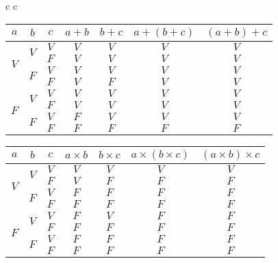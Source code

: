 \documentclass{scrartcl}
\begin{document}
			\begin{adjustbox}{center}
			\begin{tabular}{c c}
			\begin{tabular}{|c|c|c|c|c|c|c|}
				\hline
				$a$                  & $b$                  & $c$ & $a+b$ & $b+c$ & $a+(b+c)$ & $(a+b)+c$ \\ \hline
				\multirow{4}{*}{$V$} & \multirow{2}{*}{$V$} & $V$ & $V$   & $V$   & $V$       & $V$       \\ \cline{3-7} 
									 &                      & $F$ & $V$   & $V$   & $V$       & $V$       \\ \cline{2-7} 
									 & \multirow{2}{*}{$F$} & $V$ & $V$   & $V$   & $V$       & $V$       \\ \cline{3-7} 
									 &                      & $F$ & $V$   & $F$   & $V$       & $V$       \\ \hline
				\multirow{4}{*}{$F$} & \multirow{2}{*}{$V$} & $V$ & $V$   & $V$   & $V$       & $V$       \\ \cline{3-7} 
									 &                      & $F$ & $V$   & $V$   & $V$       & $V$       \\ \cline{2-7} 
									 & \multirow{2}{*}{$F$} & $V$ & $F$   & $V$   & $V$       & $V$       \\ \cline{3-7} 
									 &                      & $F$ & $F$   & $F$   & $F$       & $F$       \\ \hline
			\end{tabular}

			\begin{tabular}{|c|c|c|c|c|c|c|}
				\hline
				$a$                  & $b$                  & $c$ & $a\times b$ & $b\times c$ & $a\times(b \times c)$ & $(a\times b) \times c$ \\ \hline
				\multirow{4}{*}{$V$} & \multirow{2}{*}{$V$} & $V$ & $V$   & $V$   & $V$       & $V$       \\ \cline{3-7} 
									 &                      & $F$ & $V$   & $F$   & $F$       & $F$       \\ \cline{2-7} 
									 & \multirow{2}{*}{$F$} & $V$ & $F$   & $F$   & $F$       & $F$       \\ \cline{3-7} 
									 &                      & $F$ & $F$   & $F$   & $F$       & $F$       \\ \hline
				\multirow{4}{*}{$F$} & \multirow{2}{*}{$V$} & $V$ & $F$   & $V$   & $F$       & $F$       \\ \cline{3-7} 
									 &                      & $F$ & $F$   & $F$   & $F$       & $F$       \\ \cline{2-7} 
									 & \multirow{2}{*}{$F$} & $V$ & $F$   & $F$   & $F$       & $F$       \\ \cline{3-7} 
									 &                      & $F$ & $F$   & $F$   & $F$       & $F$       \\ \hline
			\end{tabular}
			\end{tabular}
			\end{adjustbox}
\end{document}
